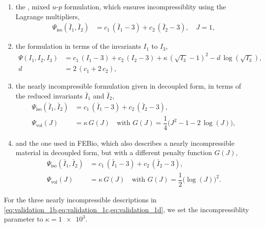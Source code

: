\begin{enumerate}[label=(\roman*)]
\item the , mixed $u$-$p$ formulation, which ensures incompressiblity using the Lagrange multipliers,
\begin{align}
    \Psi_\text{iso}(\bar{I}_1,\bar{I}_2) &= c_1\,(\bar{I}_1 - 3) + c_2\,(\bar{I}_2 - 3), \quad J=1, \label{eq:validation_incompressible}
\end{align}
\item the  formulation in terms of the invariants $I_1$ to $I_3$,
\begin{subequations}\label{eq:validation_1b}
  \begin{align}      
      \Psi(I_1,I_2,I_3) &= c_1\,(I_1 - 3) + c_2\,(I_2 - 3) + \kappa\,(\sqrt{I_3} - 1)^2 - d\,\log(\sqrt{I_3}),\label{eq:validation_nearly_incompressible_1} \\
         d &= 2\,(c_1 + 2\,c_2) \label{eq:validation_nearly_incompressible},
\end{align}
\end{subequations}
\item the nearly incompressible formulation given in decoupled form, in terms of the reduced invariants $\bar{I}_1$ and $\bar{I}_2$,
\begin{subequations}\label{eq:validation_1c}
  \begin{align}
      \Psi_\text{iso}(\bar{I}_1,\bar{I}_2) &= c_1\,(\bar{I}_1 - 3) + c_2\,(\bar{I}_2 - 3),\label{eq:validation_nearly_incompressible_decoupled_1} \\ 
      \Psi_\text{vol}(J) &= \kappa\,G(J) \quad\text{with }  G(J) = \dfrac14\big(J^2 - 1 - 2\,\log(J)\big), \label{eq:validation_nearly_incompressible_decoupled}
  \end{align}
\end{subequations}
\item and the one used in FEBio, which also describes a nearly incompressible material in decoupled form, but with a different penalty function $G(J)$,
\begin{subequations}\label{eq:validation_1d}
  \begin{align}
      \Psi_\text{iso}(\bar{I}_1,\bar{I}_2) &= c_1\,(\bar{I}_1 - 3) + c_2\,(\bar{I}_2 - 3),\label{eq:validation_nearly_incompressible_decoupled_febio_1} \\ 
      \Psi_\text{vol}(J) &= \kappa\,G(J) \quad\text{with } G(J) = \dfrac12\big(\log(J)\big)^2 \label{eq:validation_nearly_incompressible_decoupled_febio}.
  \end{align}
\end{subequations}
\end{enumerate}
%
For the three nearly incompressible descriptions in \cref{eq:validation_1b,eq:validation_1c,eq:validation_1d}, we set the incompressiblity parameter to $\kappa=\num{1e3}$.

